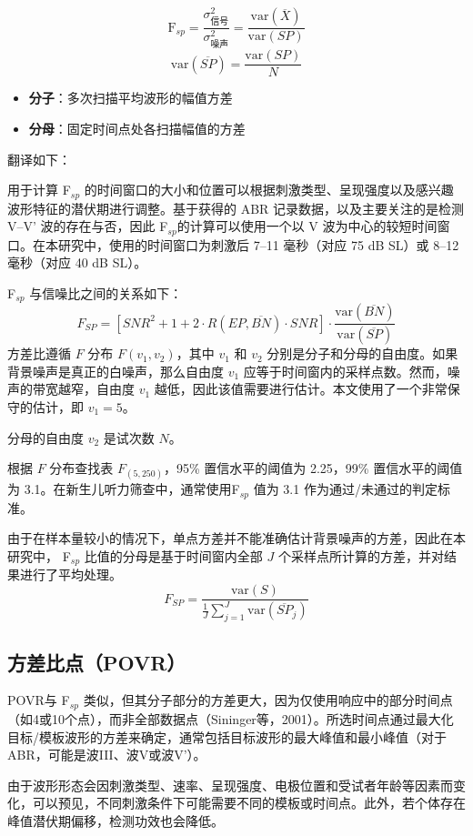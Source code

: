 \[
\text{F}_{sp} = \frac{\sigma^2_{\text{信号}}}{\sigma^2_{\text{噪声}}}
= \frac{\mathrm{var}(\overline{X})}{\mathrm{var}(SP)}
\]
\[
\mathrm{var}(\overline{SP}) = \frac{\mathrm{var}(SP)}{N}
\]

\begin{itemize}
    \item \textbf{分子}：多次扫描平均波形的幅值方差
    \item \textbf{分母}：固定时间点处各扫描幅值的方差
\end{itemize}
翻译如下：

用于计算 F$_{sp}$ 的时间窗口的大小和位置可以根据刺激类型、呈现强度以及感兴趣波形特征的潜伏期进行调整。基于获得的 ABR 记录数据，以及主要关注的是检测 V–V' 波的存在与否，因此 F$_{sp}$的计算可以使用一个以 V 波为中心的较短时间窗口。在本研究中，使用的时间窗口为刺激后 7–11 毫秒（对应 75 dB SL）或 8–12 毫秒（对应 40 dB SL）。

 F$_{sp}$  与信噪比之间的关系如下：
\[
F_{SP} = \left[ SNR^2 + 1 + 2 \cdot R(EP, \overline{BN}) \cdot SNR \right] \cdot \frac{\mathrm{var}(\overline{BN})}{\mathrm{var}(\overline{SP})}
\]
方差比遵循 $F$ 分布 \( F(v_1, v_2) \)，其中 \( v_1 \) 和 \( v_2 \) 分别是分子和分母的自由度。如果背景噪声是真正的白噪声，那么自由度 \( v_1 \) 应等于时间窗内的采样点数。然而，噪声的带宽越窄，自由度 \( v_1 \) 越低，因此该值需要进行估计。本文使用了一个非常保守的估计，即 \( v_1 = 5 \)。

分母的自由度 \( v_2 \) 是试次数 \( N \)。

根据 $F$ 分布查找表 \( F_{(5, 250)} \)，95\% 置信水平的阈值为 2.25，99\% 置信水平的阈值为 3.1。在新生儿听力筛查中，通常使用F$_{sp}$ 值为 3.1 作为通过/未通过的判定标准。

由于在样本量较小的情况下，单点方差并不能准确估计背景噪声的方差，因此在本研究中， F$_{sp}$  比值的分母是基于时间窗内全部 \( J \) 个采样点所计算的方差，并对结果进行了平均处理。
\[
F_{SP} = \frac{\text{var}(S)}{\frac{1}{J}\sum_{j=1}^{J}\text{var}(\overline{SP}_{j})}
\]
\subsection*{方差比点（POVR）}
POVR与  F$_{sp}$ 类似，但其分子部分的方差更大，因为仅使用响应中的部分时间点（如4或10个点），而非全部数据点（Sininger等，2001）。所选时间点通过最大化目标/模板波形的方差来确定，通常包括目标波形的最大峰值和最小峰值（对于ABR，可能是波III、波V或波V'）。

由于波形形态会因刺激类型、速率、呈现强度、电极位置和受试者年龄等因素而变化，可以预见，不同刺激条件下可能需要不同的模板或时间点。此外，若个体存在峰值潜伏期偏移，检测功效也会降低。

